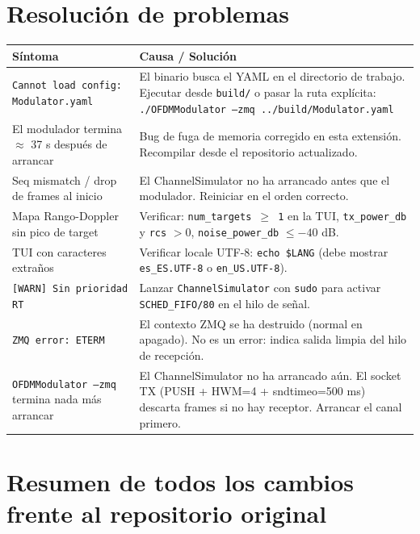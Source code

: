 \documentclass[11pt,a4paper]{article}
\begin{document}
\section{Resolución de problemas}

{\small
\begin{tabularx}{\linewidth}{p{4.8cm}X}
\toprule
\textbf{Síntoma} & \textbf{Causa / Solución} \\
\midrule
\texttt{Cannot load config: Modulator.yaml} &
  El binario busca el YAML en el directorio de trabajo.
  Ejecutar desde \texttt{build/} o pasar la ruta explícita:
  \texttt{./OFDMModulator --zmq ../build/Modulator.yaml} \\
\addlinespace
El modulador termina $\approx$ 37 s después de arrancar &
  Bug de fuga de memoria corregido en esta extensión.
  Recompilar desde el repositorio actualizado. \\
\addlinespace
Seq mismatch / drop de frames al inicio &
  El ChannelSimulator no ha arrancado antes que el modulador.
  Reiniciar en el orden correcto. \\
\addlinespace
Mapa Rango-Doppler sin pico de target &
  Verificar: \texttt{num\_targets $\geq$ 1} en la TUI,
  \texttt{tx\_power\_db} y \texttt{rcs} $> 0$,
  \texttt{noise\_power\_db} $\leq -40$ dB. \\
\addlinespace
TUI con caracteres extraños &
  Verificar locale UTF-8: \texttt{echo \$LANG}
  (debe mostrar \texttt{es\_ES.UTF-8} o \texttt{en\_US.UTF-8}). \\
\addlinespace
\texttt{[WARN] Sin prioridad RT} &
  Lanzar \texttt{ChannelSimulator} con \texttt{sudo} para
  activar \texttt{SCHED\_FIFO/80} en el hilo de señal. \\
\addlinespace
\texttt{ZMQ error: ETERM} &
  El contexto ZMQ se ha destruido (normal en apagado).
  No es un error: indica salida limpia del hilo de recepción. \\
\addlinespace
\texttt{OFDMModulator --zmq} termina nada más arrancar &
  El ChannelSimulator no ha arrancado aún. El socket TX
  (PUSH + HWM=4 + sndtimeo=500 ms) descarta frames si
  no hay receptor. Arrancar el canal primero. \\
\bottomrule
\end{tabularx}
}%

\section{Resumen de todos los cambios frente al repositorio original}
\end{document}
